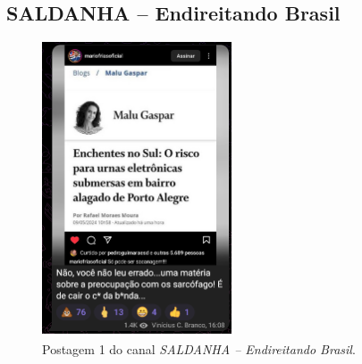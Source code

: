 \documentclass[portuguese]{textolivre}
\begin{document}
\subsection{SALDANHA -- Endireitando Brasil}
\begin{figure}[h!]
    \centering
    \begin{minipage}[t]{0.3\textwidth}
        \centering
        \includegraphics[width=\linewidth]{Imagens/Fig33.png}
        \caption{Postagem 1 do canal \emph{SALDANHA -- Endireitando Brasil}.}
        \label{fig-33}
    \end{minipage}
    \hfill
    \begin{minipage}[t]{0.3\textwidth}
        \centering

\end{minipage}
\end{figure}
\end{document}
